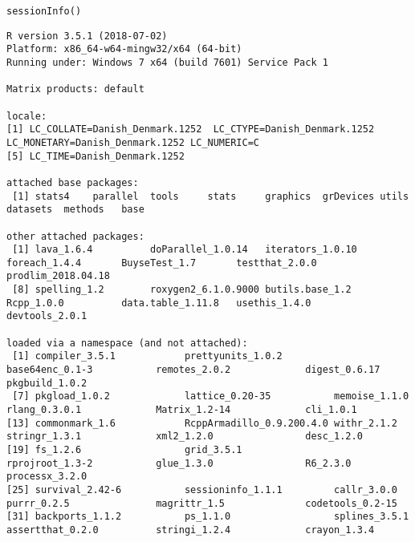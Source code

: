 \documentclass[12pt]{article}
\begin{document}
\lstset{language=r,label= ,caption= ,captionpos=b,numbers=none}
\begin{lstlisting}
sessionInfo()
\end{lstlisting}

\begin{verbatim}
R version 3.5.1 (2018-07-02)
Platform: x86_64-w64-mingw32/x64 (64-bit)
Running under: Windows 7 x64 (build 7601) Service Pack 1

Matrix products: default

locale:
[1] LC_COLLATE=Danish_Denmark.1252  LC_CTYPE=Danish_Denmark.1252    LC_MONETARY=Danish_Denmark.1252 LC_NUMERIC=C                   
[5] LC_TIME=Danish_Denmark.1252    

attached base packages:
 [1] stats4    parallel  tools     stats     graphics  grDevices utils     datasets  methods   base     

other attached packages:
 [1] lava_1.6.4          doParallel_1.0.14   iterators_1.0.10    foreach_1.4.4       BuyseTest_1.7       testthat_2.0.0      prodlim_2018.04.18 
 [8] spelling_1.2        roxygen2_6.1.0.9000 butils.base_1.2     Rcpp_1.0.0          data.table_1.11.8   usethis_1.4.0       devtools_2.0.1     

loaded via a namespace (and not attached):
 [1] compiler_3.5.1            prettyunits_1.0.2         base64enc_0.1-3           remotes_2.0.2             digest_0.6.17             pkgbuild_1.0.2           
 [7] pkgload_1.0.2             lattice_0.20-35           memoise_1.1.0             rlang_0.3.0.1             Matrix_1.2-14             cli_1.0.1                
[13] commonmark_1.6            RcppArmadillo_0.9.200.4.0 withr_2.1.2               stringr_1.3.1             xml2_1.2.0                desc_1.2.0               
[19] fs_1.2.6                  grid_3.5.1                rprojroot_1.3-2           glue_1.3.0                R6_2.3.0                  processx_3.2.0           
[25] survival_2.42-6           sessioninfo_1.1.1         callr_3.0.0               purrr_0.2.5               magrittr_1.5              codetools_0.2-15         
[31] backports_1.1.2           ps_1.1.0                  splines_3.5.1             assertthat_0.2.0          stringi_1.2.4             crayon_1.3.4
\end{verbatim}
\end{document}
